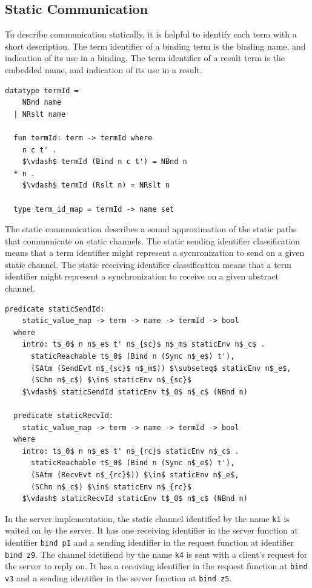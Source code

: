 \documentclass[letterpaper, 11pt]{extarticle}
\begin{document}
\subsection{Static Communication}
To describe communication statically, it is helpful to identify each term with a short description.
The term identifier of a binding term is the binding name, and indication of its use in a binding.
The term identifier of a result term is the embedded name, and indication of its use in a result.

\begin{lstlisting}[language=logic, mathescape]
  datatype termId =
    NBnd name
  | NRslt name 

  fun termId: term -> termId where
    n c t' . 
    $\vdash$ termId (Bind n c t') = NBnd n
  * n . 
    $\vdash$ termId (Rslt n) = NRslt n

  type term_id_map = termId -> name set
\end{lstlisting}

The static communication describes a sound approximation of
the static paths that communicate on static channels.
The static sending identifier classification means that a term identifier might represent a
sycnronization to send on a given static channel.
The static receiving identifier classification means that a term identifier might represent a
synchronization to receive on a given abstract channel. 

\begin{lstlisting}[language=logic, mathescape]
  predicate staticSendId:
    static_value_map -> term -> name -> termId -> bool 
  where
    intro: t$_0$ n n$_e$ t' n$_{sc}$ n$_m$ staticEnv n$_c$ .
      staticReachable t$_0$ (Bind n (Sync n$_e$) t'),
      (SAtm (SendEvt n$_{sc}$ n$_m$)) $\subseteq$ staticEnv n$_e$, 
      (SChn n$_c$) $\in$ staticEnv n$_{sc}$
    $\vdash$ staticSendId staticEnv t$_0$ n$_c$ (NBnd n)

  predicate staticRecvId:
    static_value_map -> term -> name -> termId -> bool
  where
    intro: t$_0$ n n$_e$ t' n$_{rc}$ staticEnv n$_c$ .
      staticReachable t$_0$ (Bind n (Sync n$_e$) t'),
      (SAtm (RecvEvt n$_{rc}$)) $\in$ staticEnv n$_e$, 
      (SChn n$_c$) $\in$ staticEnv n$_{rc}$ 
    $\vdash$ staticRecvId staticEnv t$_0$ n$_c$ (NBnd n)
\end{lstlisting}


In the server implementation,
the static channel identified by the name \lstinline{k1} is waited on
by the server.  It has one receiving identifier in the server function
at identifier \lstinline[language=sugar_lang]{bind p1} and a sending identifier 
in the request function at identifier \lstinline[language=sugar_lang]{bind z9}.
The channel idetifiend by the name \lstinline{k4} is sent with a client's request for
the server to reply on. It has a receiving identifier in the request function at
\lstinline[language=sugar_lang]{bind v3} and a sending identifier in the server function at
\lstinline[language=sugar_lang]{bind z5}.
\end{document}
